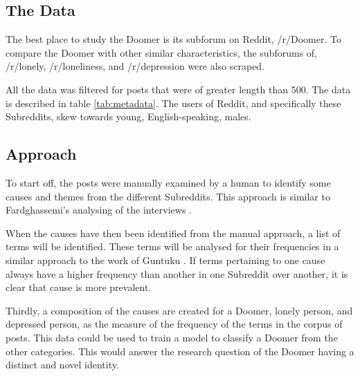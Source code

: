 \documentclass[../report.tex]{subfiles}
\begin{document}
\subsection{The Data}
The best place to study the Doomer is its subforum on Reddit, /r/Doomer. To compare the Doomer with other similar characteristics, the subforums of, /r/lonely, /r/loneliness, and /r/depression were also scraped.

All the data was filtered for posts that were of greater length than 500. The data is described in table \ref{tab:metadata}.
The users of Reddit, and specifically these Subreddits, skew towards young, English-speaking, males. 


\subsection{Approach}
To start off, the posts were manually examined by a human to identify some causes and themes from the different Subreddits. 
This approach is similar to Fardghassemi's analysing of the interviews \cite{fardghassemi_interviews}.

When the causes have then been identified from the manual approach, a list of terms will be identified.
These terms will be analysed for their frequencies in a similar approach to the work of Guntuku \cite{twitter_loneliness}.
If terms pertaining to one cause always have a higher frequency than another in one Subreddit over another, it is clear that cause is more prevalent. 

Thirdly, a composition of the causes are created for a Doomer, lonely person, and depressed person, as the measure of the frequency of the terms in the corpus of posts. This data could be used to train a model to classify a Doomer from the other categories. This would answer the research question of the Doomer having a distinct and novel identity.
\end{document}
